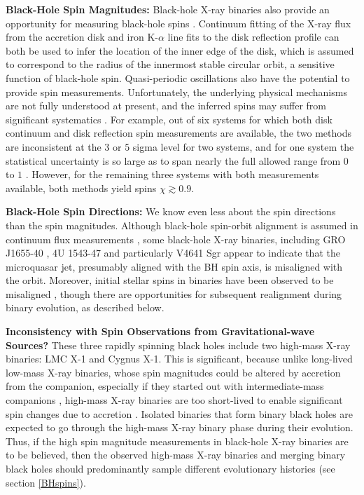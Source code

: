 \documentclass[review]{elsarticle}
\begin{document}
\textbf{Black-Hole Spin Magnitudes:} Black-hole X-ray binaries also provide an opportunity for measuring black-hole spins \citep[see][for a recent review]{MillerMiller:2015}.  Continuum fitting of the X-ray flux from the accretion disk and iron K-$\alpha$ line fits to the disk reflection profile can both be used to infer the location of the inner edge of the disk, which is assumed to correspond to the radius of the innermost stable circular orbit, a sensitive function of black-hole spin.  Quasi-periodic oscillations also have the potential to provide spin measurements.  Unfortunately, the underlying physical mechanisms are not fully understood at present, and the inferred spins may suffer from significant systematics \citep[e.g.,][]{Kawano:2017}.  For example, out of six systems for which both disk continuum and disk reflection spin measurements are available, the two methods are inconsistent at the $3$ or $5$ sigma level for two systems, and for one system the statistical uncertainty is so large as to span nearly the full allowed range from $0$ to $1$ \cite{MillerMiller:2015}.  However, for the remaining three systems with both measurements available, both methods yield spins $\chi \gtrsim 0.9$.  

\textbf{Black-Hole Spin Directions:} We know even less about the spin directions than the spin magnitudes.  Although black-hole spin-orbit alignment is assumed in continuum flux measurements \citep{MillerMiller:2015}, some black-hole X-ray binaries, including GRO J1655-40 \citep{Martin:2008}, 4U 1543-47 \citep{MorningstarMiller:2014} and particularly V4641 Sgr \citep{Orosz:2001,Martin:2008b} appear to indicate that the microquasar jet, presumably aligned with the BH spin axis, is misaligned with the orbit.  Moreover, initial stellar spins in binaries have been observed to be misaligned \citep[e.g.,][]{Albrecht:2009,Albrecht:2014}, though there are opportunities for subsequent realignment during binary evolution, as described below.

\textbf{Inconsistency with Spin Observations from Gravitational-wave Sources?} These three rapidly spinning black holes include two high-mass X-ray binaries: LMC X-1 and Cygnus X-1.  This is significant, because unlike long-lived low-mass X-ray binaries, whose spin magnitudes could be altered by accretion from the companion, especially if they started out with intermediate-mass companions \citep{Podsiadlowski:2003,Fragos:2015}, high-mass X-ray binaries are too short-lived to enable significant spin changes due to accretion \citep{KingKolb:1999}.  Isolated binaries that form binary black holes are expected to go through the high-mass X-ray binary phase during their evolution.  Thus, if the high spin magnitude measurements in black-hole X-ray binaries are to be believed, then the observed high-mass X-ray binaries and merging binary black holes should predominantly sample different evolutionary histories (see section \ref{BHspins}).
\end{document}
